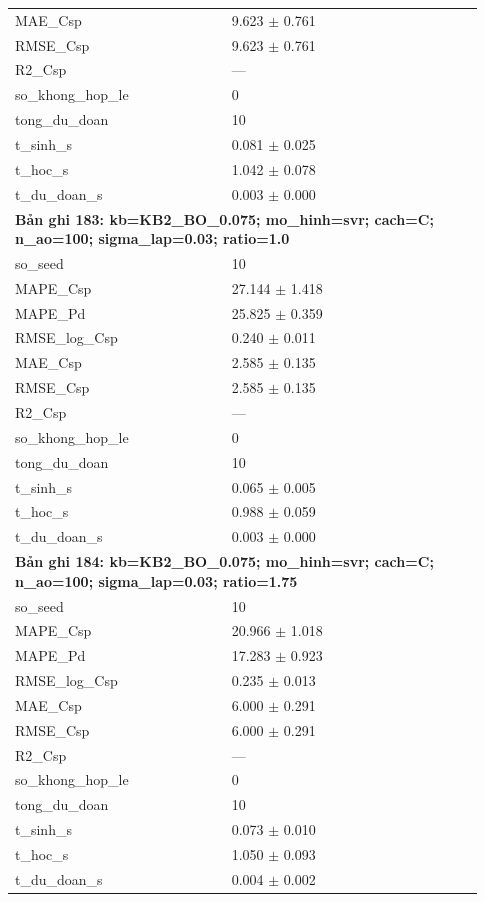 \begin{longtable}{p{0.43\linewidth}p{0.50\linewidth}}
MAE\_\allowbreak Csp & 9.623 $\pm$ 0.761 \\
RMSE\_\allowbreak Csp & 9.623 $\pm$ 0.761 \\
R2\_\allowbreak Csp & — \\
so\_\allowbreak khong\_\allowbreak hop\_\allowbreak le & 0 \\
tong\_\allowbreak du\_\allowbreak doan & 10 \\
t\_\allowbreak sinh\_\allowbreak s & 0.081 $\pm$ 0.025 \\
t\_\allowbreak hoc\_\allowbreak s & 1.042 $\pm$ 0.078 \\
t\_\allowbreak du\_\allowbreak doan\_\allowbreak s & 0.003 $\pm$ 0.000 \\
\midrule
\multicolumn{2}{p{0.95\linewidth}}{\textbf{Bản ghi 183: kb=KB2\_BO\_0.075; mo\_hinh=svr; cach=C; n\_ao=100; sigma\_lap=0.03; ratio=1.0}} \\
so\_\allowbreak seed & 10 \\
MAPE\_\allowbreak Csp & 27.144 $\pm$ 1.418 \\
MAPE\_\allowbreak Pd & 25.825 $\pm$ 0.359 \\
RMSE\_\allowbreak log\_\allowbreak Csp & 0.240 $\pm$ 0.011 \\
MAE\_\allowbreak Csp & 2.585 $\pm$ 0.135 \\
RMSE\_\allowbreak Csp & 2.585 $\pm$ 0.135 \\
R2\_\allowbreak Csp & — \\
so\_\allowbreak khong\_\allowbreak hop\_\allowbreak le & 0 \\
tong\_\allowbreak du\_\allowbreak doan & 10 \\
t\_\allowbreak sinh\_\allowbreak s & 0.065 $\pm$ 0.005 \\
t\_\allowbreak hoc\_\allowbreak s & 0.988 $\pm$ 0.059 \\
t\_\allowbreak du\_\allowbreak doan\_\allowbreak s & 0.003 $\pm$ 0.000 \\
\midrule
\multicolumn{2}{p{0.95\linewidth}}{\textbf{Bản ghi 184: kb=KB2\_BO\_0.075; mo\_hinh=svr; cach=C; n\_ao=100; sigma\_lap=0.03; ratio=1.75}} \\
so\_\allowbreak seed & 10 \\
MAPE\_\allowbreak Csp & 20.966 $\pm$ 1.018 \\
MAPE\_\allowbreak Pd & 17.283 $\pm$ 0.923 \\
RMSE\_\allowbreak log\_\allowbreak Csp & 0.235 $\pm$ 0.013 \\
MAE\_\allowbreak Csp & 6.000 $\pm$ 0.291 \\
RMSE\_\allowbreak Csp & 6.000 $\pm$ 0.291 \\
R2\_\allowbreak Csp & — \\
so\_\allowbreak khong\_\allowbreak hop\_\allowbreak le & 0 \\
tong\_\allowbreak du\_\allowbreak doan & 10 \\
t\_\allowbreak sinh\_\allowbreak s & 0.073 $\pm$ 0.010 \\
t\_\allowbreak hoc\_\allowbreak s & 1.050 $\pm$ 0.093 \\
t\_\allowbreak du\_\allowbreak doan\_\allowbreak s & 0.004 $\pm$ 0.002 \\
\midrule
\bottomrule
\end{longtable}
